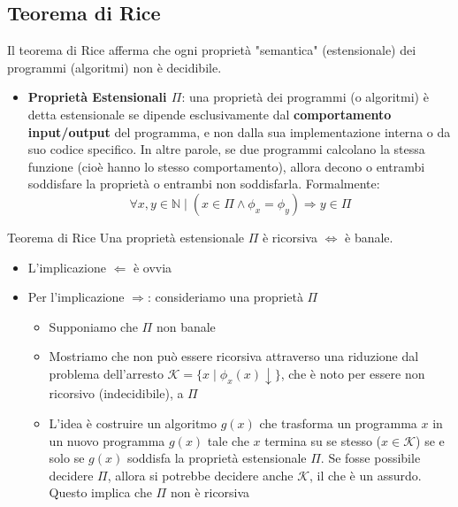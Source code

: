 \documentclass[12pt, a4paper]{report}
\begin{document}
                    \subsection{Teorema di Rice}
                        Il teorema di Rice afferma che ogni proprietà "semantica" (estensionale) dei programmi (algoritmi) non è decidibile.
                        \begin{itemize}
                            \item \textbf{Proprietà Estensionali $\Pi$}: una proprietà dei programmi (o algoritmi) è detta estensionale se dipende esclusivamente dal \textbf{comportamento input/output} del programma, e non dalla sua implementazione interna o da suo codice specifico. In altre parole, se due programmi calcolano la stessa funzione (cioè hanno lo stesso comportamento), allora decono o entrambi soddisfare la proprietà o entrambi non soddisfarla. Formalmente: $$\forall x,y\in\mathbb{N}\mid (x\in\Pi\land\phi_x=\phi_y)\Rightarrow y\in\Pi$$ 
                        \end{itemize}        
                        \begin{theorembox}{Teorema di Rice}{}
                            Una proprietà estensionale $\Pi$ è ricorsiva $\iff$ è banale.
                        \end{theorembox}
                        \begin{demonstration}
                            \begin{itemize}
                                \item L'implicazione $\Leftarrow$ è ovvia
                                \item Per l'implicazione $\Rightarrow$: consideriamo una proprietà $\Pi$ \begin{itemize}
                                    \item Supponiamo che $\Pi$ non banale
                                    \item Mostriamo che non può essere ricorsiva attraverso una riduzione dal problema dell'arresto $\mathcal{K}=\{x\mid\phi_x(x)\downarrow\}$, che è noto per essere non ricorsivo (indecidibile), a $\Pi$
                                    \item L'idea è costruire un algoritmo $g(x)$ che trasforma un programma $x$ in un nuovo programma $g(x)$ tale che $x$ termina su se stesso ($x \in \mathcal{K}$) se e solo se $g(x)$ soddisfa la proprietà estensionale $\Pi$. Se fosse possibile decidere $\Pi$, allora si potrebbe decidere anche $\mathcal{K}$, il che è un assurdo. Questo implica che $\Pi$ non è ricorsiva
                                \end{itemize}
                            \end{itemize} 
                        \end{demonstration}
\end{document}
